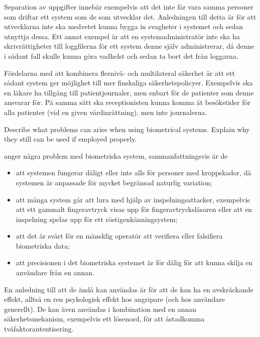 \documentclass[a4paper,addpoints]{exam}
\begin{document}
\begin{questions}
\begin{solution}
    Separation av uppgifter innebär exempelvis att det inte får vara samma 
    personer som driftar ett system som de som utvecklar det.
    Anledningen till detta är för att utvecklarna inte ska medvetet kunna bygga 
    in svagheter i systemet och sedan utnyttja dessa.
    Ett annat exempel är att en systemadministratör inte ska ha 
    skrivrättigheter till loggfilerna för ett system denne själv administrerar, 
    då denne i sådant fall skulle kunna göra vadhelst och sedan ta bort det 
    från loggarna.

    Fördelarna med att kombinera flernivå- och multilateral säkerhet är att ett 
    sådant system ger möjlighet till mer finskaliga säkerhetspolicyer.
    Exempelvis ska en läkare ha tillgång till patientjournaler, men enbart för 
    de patienter som denne ansvarar för.
    På samma sätt ska receptionisten kunna komma åt besökstider för alla 
    patienter (vid en given vårdinrättning), men inte journalerna.
  \end{solution}


  \question[5]\label{q:biometrics:E:C:A}
  Describe what problems can arise when using biometrical systems.
  Explain why they still can be used if employed properly.

  \begin{solution}
    \citet{Anderson2008sea} anger några problem med biometriska system, 
    sammanfattningsvis är de
    \begin{itemize}
      \item att systemen fungerar dåligt eller inte alls för personer med 
        kroppskador, då systemen är anpassade för mycket begränsad naturlig 
        variation;
      \item att många system går att lura med hjälp av inspelningsattacker, 
        exempelvis att ett gammalt fingeravtryck visas upp för 
        fingeravtrycksläsaren eller att en inspelning spelas upp för ett 
        röstigenkänningsystem;
      \item att det är svårt för en mänsklig operatör att verifiera eller 
        falsifiera biometriska data;
      \item att precisionen i det biometriska systemet är för dålig för att 
        kunna skilja en användare från en annan.
    \end{itemize}

    En anledning till att de ändå kan användas är för att de kan ha en 
    avskräckande effekt, alltså en ren psykologisk effekt hos angripare (och 
    hos användare generellt).
    De kan även användas i kombination med en annan säkerhetsmekanism, 
    exempelvis ett lösenord, för att åstadkomma tvåfaktorautentisering.
  \end{solution}



\end{questions}
\end{document}
